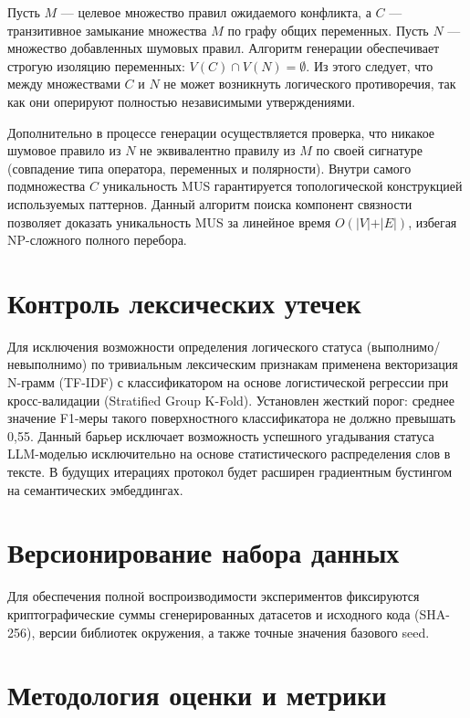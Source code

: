 Пусть $M$ — целевое множество правил ожидаемого конфликта, а $C$ — транзитивное замыкание множества $M$ по графу общих переменных. Пусть $N$ — множество добавленных шумовых правил. 
Алгоритм генерации обеспечивает строгую изоляцию переменных: $V(C) \cap V(N) = \emptyset$. Из этого следует, что между множествами $C$ и $N$ не может возникнуть логического противоречия, так как они оперируют полностью независимыми утверждениями. 

Дополнительно в процессе генерации осуществляется проверка, что никакое шумовое правило из $N$ не эквивалентно правилу из $M$ по своей сигнатуре (совпадение типа оператора, переменных и полярности). Внутри самого подмножества $C$ уникальность MUS гарантируется топологической конструкцией используемых паттернов. Данный алгоритм поиска компонент связности позволяет доказать уникальность MUS за линейное время $O(\vert V \vert + \vert E \vert)$, избегая NP-сложного полного перебора.

\section{Контроль лексических утечек}
Для исключения возможности определения логического статуса (выполнимо/невыполнимо) по тривиальным лексическим признакам применена векторизация N-грамм (TF-IDF) с классификатором на основе логистической регрессии при кросс-валидации (Stratified Group K-Fold). Установлен жесткий порог: среднее значение F1-меры такого поверхностного классификатора не должно превышать 0,55. Данный барьер исключает возможность успешного угадывания статуса LLM-моделью исключительно на основе статистического распределения слов в тексте. В будущих итерациях протокол будет расширен градиентным бустингом на семантических эмбеддингах.

\section{Версионирование набора данных}
Для обеспечения полной воспроизводимости экспериментов фиксируются криптографические суммы сгенерированных датасетов и исходного кода (SHA-256), версии библиотек окружения, а также точные значения базового seed.

\section{Методология оценки и метрики}

